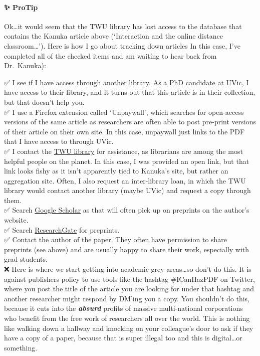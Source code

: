 \documentclass[
]{book}
\begin{document}
\begin{protip}
\hypertarget{protip}{%
\paragraph*{✨ ProTip}\label{protip}}

Ok\ldots it would seem that the TWU library has lost access to the
database that contains the Kanuka article above (`Interaction and the
online distance classroom\ldots{}'). Here is how I go about tracking
down articles In this case, I've completed all of the checked items and
am waiting to hear back from Dr.~Kanuka):

✅ I see if I have access through another library. As a PhD candidate at
UVic, I have access to their library, and it turns out that this article
is in their collection, but that doesn't help you.\\
✅ I use a Firefox extension called `Unpaywall', which searches for
open-access versions of the same article as researchers are often able
to post pre-print versions of their article on their own site. In this
case, unpaywall just links to the PDF that I have access to through
UVic.\\
✅ I contact the \href{https://libguides.twu.ca/help}{TWU library} for
assistance, as librarians are among the most helpful people on the
planet. In this case, I was provided an open link, but that link looks
fishy as it isn't apparently tied to Kanuka's site, but rather an
aggregation site. Often, I also request an inter-library loan, in which
the TWU library would contact another library (maybe UVic) and request a
copy through them.\\
✅ Search \href{https://scholar.google.com}{Google Scholar} as that will
often pick up on preprints on the author's website.\\
✅ Search \href{https://www.researchgate.net/}{ResearchGate} for
preprints.\\
✅ Contact the author of the paper. They often have permission to share
preprints (see above) and are usually happy to share their work,
especially with grad students.\\
❌ Here is where we start getting into academic grey areas\ldots so
don't do this. It is against publishers policy to use tools like the
hashtag \#ICanHazPDF on Twitter, where you post the title of the article
you are looking for under that hashtag and another researcher might
respond by DM'ing you a copy. You shouldn't do this, because it cuts
into the \textbf{\emph{absurd}} profits of massive multi-national
corporations who benefit from the free work of researchers all over the
world. This is nothing like walking down a hallway and knocking on your
colleague's door to ask if they have a copy of a paper, because that is
super illegal too and this is digital\ldots or something.


\end{protip}
\end{document}

